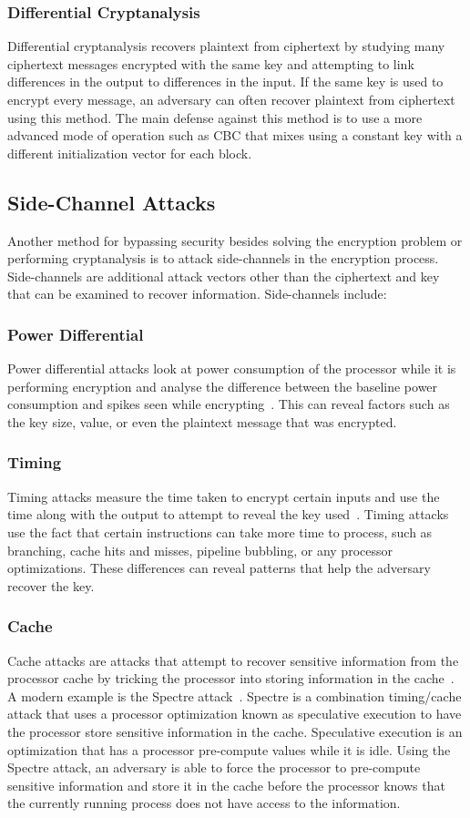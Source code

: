 \documentclass[journal]{IEEEtran}
\begin{document}
\subsubsection{Differential Cryptanalysis}
Differential cryptanalysis recovers plaintext from ciphertext by studying many ciphertext messages encrypted with the same key and attempting to link differences in the output to differences in the input. If the same key is used to encrypt every message, an adversary can often recover plaintext from ciphertext using this method. The main defense against this method is to use a more advanced mode of operation such as CBC that mixes using a constant key with a different initialization vector for each block. 
\subsection{Side-Channel Attacks}
Another method for bypassing security besides solving the encryption problem or performing cryptanalysis is to attack side-channels in the encryption process. Side-channels are additional attack vectors other than the ciphertext and key that can be examined to recover information. Side-channels include:
\subsubsection{Power Differential}
Power differential attacks look at power consumption of the processor while it is performing encryption and analyse the difference between the baseline power consumption and spikes seen while encrypting~\cite{SC1}. This can reveal factors such as the key size, value, or even the plaintext message that was encrypted.
\subsubsection{Timing}
Timing attacks measure the time taken to encrypt certain inputs and use the time along with the output to attempt to reveal the key used~\cite{SC2}. Timing attacks use the fact that certain instructions can take more time to process, such as branching, cache hits and misses, pipeline bubbling, or any processor optimizations. These differences can reveal patterns that help the adversary recover the key.
\subsubsection{Cache}
Cache attacks are attacks that attempt to recover sensitive information from the processor cache by tricking the processor into storing information in the cache~\cite{SC4}. A modern example is the Spectre attack~\cite{SC3}. Spectre is a combination timing/cache attack that uses a processor optimization known as speculative execution to have the processor store sensitive information in the cache. Speculative execution is an optimization that has a processor pre-compute values while it is idle. Using the Spectre attack, an adversary is able to force the processor to pre-compute sensitive information and store it in the cache before the processor knows that the currently running process does not have access to the information.
\end{document}
